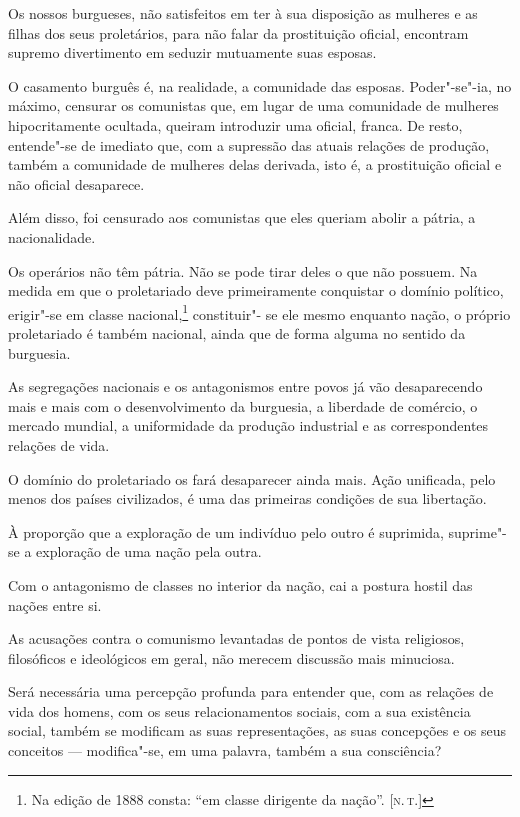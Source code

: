 Os nossos burgueses, não satisfeitos em ter à sua disposição as mulheres
e as filhas dos seus proletários, para não falar da prostituição
oficial, encontram supremo divertimento em seduzir mutuamente suas
esposas.

O casamento burguês é, na realidade, a comunidade das esposas.
Poder"-se"-ia, no máximo, censurar os comunistas que, em lugar de
uma comunidade de mulheres hipocritamente ocultada, queiram
introduzir uma oficial, franca. De resto, entende"-se de imediato que,
com a supressão das atuais relações de produção, também a comunidade de
mulheres delas derivada, isto é, a prostituição oficial e não oficial
desaparece.

Além disso, foi censurado aos comunistas que eles queriam abolir a
pátria, a nacionalidade.

Os operários não têm pátria. Não se pode tirar deles o que não
possuem. Na medida em que o proletariado deve primeiramente conquistar
o domínio político, erigir"-se em classe nacional,\footnote{ Na edição de 
1888 consta: ``em classe dirigente da nação''. [\textsc{n.\,t.}]} constituir"-
se ele mesmo enquanto nação, o próprio
proletariado é também nacional, ainda que de forma alguma no sentido da
burguesia.

As segregações nacionais e os antagonismos entre povos já vão desaparecendo
mais e mais com o desenvolvimento da burguesia, a liberdade de
comércio, o mercado mundial, a uniformidade da produção industrial
e as correspondentes relações de vida.

O domínio do proletariado os fará desaparecer ainda mais. Ação
unificada, pelo menos dos países civilizados, é uma das primeiras
condições de sua libertação.

À proporção que a exploração de um indivíduo pelo outro é suprimida,
suprime"-se a exploração de uma nação pela outra.

Com o antagonismo de classes no interior da nação, cai a postura hostil
das nações entre si.

As acusações contra o comunismo levantadas de pontos de vista
religiosos, filosóficos e ideológicos em geral, não merecem discussão
mais minuciosa.

Será necessária uma percepção profunda para entender que, com as
relações de vida dos homens, com os seus relacionamentos sociais, com a
sua existência social, também se modificam as suas representações, as
suas concepções e os seus conceitos  ---  modifica"-se, em uma palavra,
também a sua consciência?

